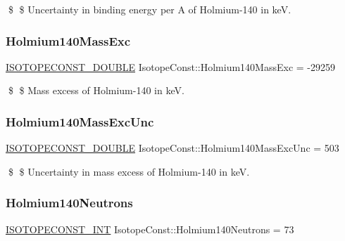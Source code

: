 \$ \$ Uncertainty in binding energy per A of Holmium-\/140 in keV. \mbox{\label{group___isotope_const-_holmium-_ho140_ga802b09ef9cc263d77a7aee614bfdcc76}} 
\subsubsection{\texorpdfstring{Holmium140\+Mass\+Exc}{Holmium140MassExc}}
{\footnotesize\ttfamily \mbox{\hyperlink{group___isotope_const-_macros_ga8f45a7272ce02c0b4c65c44636ed719a}{I\+S\+O\+T\+O\+P\+E\+C\+O\+N\+S\+T\+\_\+\+D\+O\+U\+B\+LE}} Isotope\+Const\+::\+Holmium140\+Mass\+Exc = -\/29259}

\$ \$ Mass excess of Holmium-\/140 in keV. \mbox{\label{group___isotope_const-_holmium-_ho140_ga578771a70cdeaa841bbbc5b6322e1019}} 
\subsubsection{\texorpdfstring{Holmium140\+Mass\+Exc\+Unc}{Holmium140MassExcUnc}}
{\footnotesize\ttfamily \mbox{\hyperlink{group___isotope_const-_macros_ga8f45a7272ce02c0b4c65c44636ed719a}{I\+S\+O\+T\+O\+P\+E\+C\+O\+N\+S\+T\+\_\+\+D\+O\+U\+B\+LE}} Isotope\+Const\+::\+Holmium140\+Mass\+Exc\+Unc = 503}

\$ \$ Uncertainty in mass excess of Holmium-\/140 in keV. \mbox{\label{group___isotope_const-_holmium-_ho140_ga0898554c2f4371c4c7eab9f3b697fb9b}} 
\subsubsection{\texorpdfstring{Holmium140\+Neutrons}{Holmium140Neutrons}}
{\footnotesize\ttfamily \mbox{\hyperlink{group___isotope_const-_macros_ga5f18360b3e99483a35c32d789e62621c}{I\+S\+O\+T\+O\+P\+E\+C\+O\+N\+S\+T\+\_\+\+I\+NT}} Isotope\+Const\+::\+Holmium140\+Neutrons = 73}

